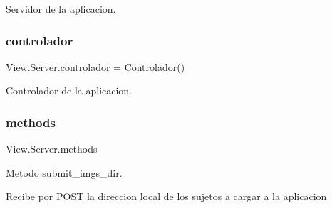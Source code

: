 Servidor de la aplicacion. 

\mbox{\label{namespace_view_1_1_server_a43f59f058a13ad9dd780b87e79bff183}} 
\subsubsection{\texorpdfstring{controlador}{controlador}}
{\footnotesize\ttfamily View.\+Server.\+controlador = \hyperlink{class_controller_1_1_controlador_1_1_controlador}{Controlador}()}



Controlador de la aplicacion. 

\mbox{\label{namespace_view_1_1_server_a2ab6609038f4f128d63e92a4e73d5f09}} 
\subsubsection{\texorpdfstring{methods}{methods}}
{\footnotesize\ttfamily View.\+Server.\+methods}



Metodo submit\+\_\+imgs\+\_\+dir. 

Recibe por P\+O\+ST la direccion local de los sujetos a cargar a la aplicacion 
